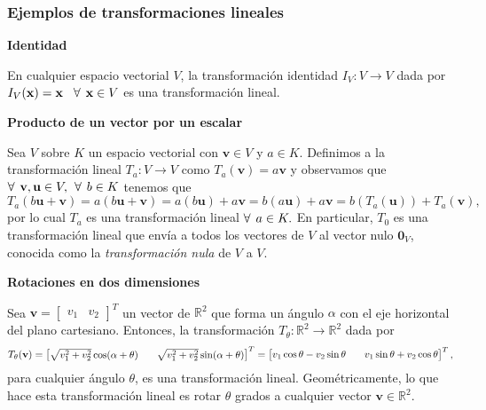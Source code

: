 \documentclass[12pt]{article}
\begin{document}
\subsubsection{Ejemplos de transformaciones lineales} \label{Ejem:Transformaciones_lineales}

\textbf{Identidad} 

\vspace{3mm}
En cualquier espacio vectorial $V$, la transformación identidad $I_V:V\to V$ dada por $I_V(\mathbf{x})=\mathbf{x} \hspace{3mm}\forall\hspace{1.5mm}\mathbf{x}\in V$ es una transformación lineal. 
\vspace{3mm}

\textbf{Producto de un vector por un escalar} 

\vspace{3mm}
Sea $V$ sobre $K$ un espacio vectorial con $\mathbf{v} \in V$ y $a\in K$. Definimos a la transformación lineal $T_a:V\to V$ como $T_a(\mathbf{v}) = a\mathbf{v}$ y observamos que $\forall \hspace{1.5mm} \mathbf{v}, \mathbf{u}\in V, \hspace{1.5mm} \forall\hspace{1.5mm} b\in K$ tenemos que \[
    T_a(b\mathbf{u}+\mathbf{v})=a(b\mathbf{u}+\mathbf{v})=a(b\mathbf{u})+a\mathbf{v}=b(a\mathbf{u})+a\mathbf{v}=b(T_a(\mathbf{u}))+T_a(\mathbf{v})
,\] \noindent por lo cual $T_a$ es una transformación lineal $\forall \hspace{1.5mm} a\in K.$ En particular, $T_0$ es una transformación lineal que envía a todos los vectores de $V$ al vector nulo $\mathbf{0}_V$, conocida como la \emph{transformación nula} de $V$ a $V$.
\vspace{3mm}

\newpage
\textbf{Rotaciones en dos dimensiones} 

\vspace{2mm}
Sea $\mathbf{v}=\begin{bmatrix} v_1&v_2 \end{bmatrix}^T$ un vector de $\mathbb{R}^2$ que forma un ángulo $\alpha$ con el eje horizontal del plano cartesiano. Entonces, la transformación $T_{\theta}:\mathbb{R}^2\to \mathbb{R}^2$ dada por \[
T_{\theta}(\mathbf{v}) = \begin{bmatrix}\sqrt{v_1^2 + v_2^2}\cos(\alpha+\theta)&\hspace{3mm} \sqrt{v_1^2 + v_2^2}\sin(\alpha+\theta) \end{bmatrix}^T = \begin{bmatrix} v_1\cos\theta-v_2\sin\theta &\hspace{3mm}  v_1\sin\theta + v_2\cos\theta \end{bmatrix}^T, 
\] \noindent para cualquier ángulo $\theta$, es una transformación lineal. Geométricamente, lo que hace esta transformación lineal es rotar $\theta$ grados a cualquier vector $\mathbf{v}\in \mathbb{R}^2$.
\vspace{3mm}
\end{document}
